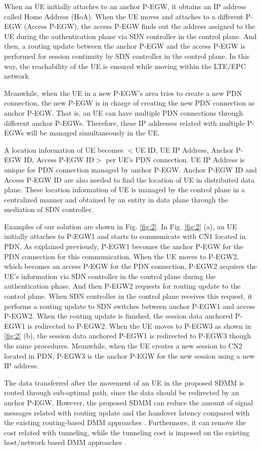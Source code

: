 \documentclass[runningheads,a4paper]{llncs}
\begin{document}
When an UE initially attaches to an anchor P-EGW, it obtains an IP address called Home Address (HoA). When the UE moves and attaches to a different P-EGW (Access P-EGW), the access P-EGW finds out the address assigned to the UE during the authentication phase via SDN controller in the control plane. And then, a routing update between the anchor P-EGW and the access P-EGW is performed for session continuity by SDN controller in the control plane. In this way, the reachability of the UE is ensured while moving within the LTE/EPC network.

Meanwhile, when the UE in a new P-EGW's area tries to create a new PDN connection, the new P-EGW is in charge of creating the new PDN connection as anchor P-EGW. That is, an UE can have multiple PDN connections through different anchor P-EGWs. Therefore, these IP addresses related with multiple P-EGWs will be managed simultaneously in the UE. 

A location information of UE becomes $<$UE ID, UE IP Address, Anchor P-EGW ID, Access P-EGW ID$>$ per UE's PDN connection. UE IP Address is unique for PDN connection managed by anchor P-EGW. Anchor P-EGW ID and Access P-EGW ID are also needed to find the location of UE in distributed data plane. These location information of UE is managed by the control plane in a centralized manner and obtained by an entity in data plane through the mediation of SDN controller.

Examples of our solution are shown in Fig. \ref{fig:2}. In Fig. \ref{fig:2} (a), an UE initially attaches to P-EGW1 and starts to communicate with CN1 located in PDN. As explained previously, P-EGW1 becomes the anchor P-EGW for the PDN connection for this communication. When the UE moves to P-EGW2, which becomes an access P-EGW for the PDN connection, P-EGW2 acquires the UE's information via SDN controller in the control plane during the authentication phase. And then P-EGW2 requests for routing update to the control plane. When SDN controller in the control plane receives this request, it performs a routing update to SDN switches between anchor P-EGW1 and access P-EGW2. When the routing update is finished, the session data anchored P-EGW1 is redirected to P-EGW2. When the UE moves to P-EGW3 as shown in \ref{fig:2} (b), the session data anchored P-EGW1 is redirected to P-EGW3 though the same procedures. Meanwhile, when the UE creates a new session to CN2 located in PDN, P-EGW3 is the anchor P-EGW for the new session using a new IP address.

The data transferred after the movement of an UE in the proposed SDMM is routed through sub-optimal path, since the data should be redirected by an anchor P-EGW. However, the proposed SDMM can reduce the amount of signal messages related with routing update and the handover latency compared with the existing routing-based DMM approaches \cite{ref12}. Furthermore, it can remove the cost related with tunneling, while the tunneling cost is imposed on the existing host/network based DMM approaches \cite{ref7}.
\end{document}
